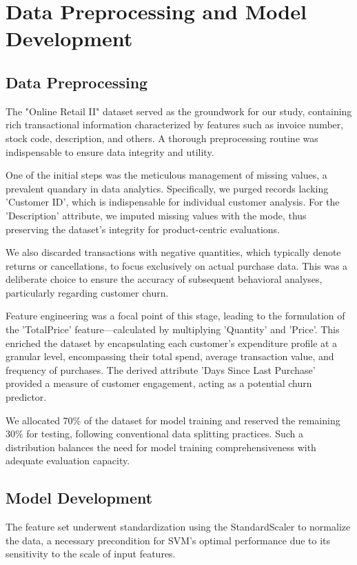 \documentclass[12pt]{article}
\begin{document}
\section*{Data Preprocessing and Model Development}

\subsection*{Data Preprocessing}
The "Online Retail II" dataset served as the groundwork for our study, containing rich transactional information characterized by features such as invoice number, stock code, description, and others. A thorough preprocessing routine was indispensable to ensure data integrity and utility.

\medskip %
One of the initial steps was the meticulous management of missing values, a prevalent quandary in data analytics. Specifically, we purged records lacking 'Customer ID', which is indispensable for individual customer analysis. For the 'Description' attribute, we imputed missing values with the mode, thus preserving the dataset's integrity for product-centric evaluations.

\medskip
We also discarded transactions with negative quantities, which typically denote returns or cancellations, to focus exclusively on actual purchase data. This was a deliberate choice to ensure the accuracy of subsequent behavioral analyses, particularly regarding customer churn.

\medskip
Feature engineering was a focal point of this stage, leading to the formulation of the 'TotalPrice' feature—calculated by multiplying 'Quantity' and 'Price'. This enriched the dataset by encapsulating each customer's expenditure profile at a granular level, encompassing their total spend, average transaction value, and frequency of purchases. The derived attribute 'Days Since Last Purchase' provided a measure of customer engagement, acting as a potential churn predictor.

\medskip
We allocated 70\% of the dataset for model training and reserved the remaining 30\% for testing, following conventional data splitting practices. Such a distribution balances the need for model training comprehensiveness with adequate evaluation capacity.

\subsection*{Model Development}
The feature set underwent standardization using the StandardScaler to normalize the data, a necessary precondition for SVM's optimal performance due to its sensitivity to the scale of input features.
\end{document}
